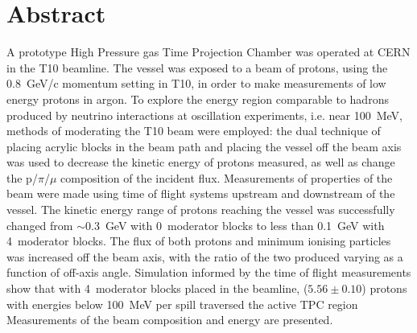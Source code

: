 \section*{Abstract}

A prototype High Pressure gas Time Projection Chamber was operated at CERN in the T10 beamline. The vessel was exposed to a beam of protons, using the 0.8~GeV/c momentum setting in T10, in order to make measurements of low energy protons in argon.
To explore the energy region comparable to hadrons produced by neutrino interactions at oscillation experiments, i.e. near 100~MeV, methods of moderating the T10 beam were employed:
the dual technique of placing acrylic blocks in the beam path and placing the vessel off the beam axis was used to decrease the kinetic energy of protons measured, as well as change the p/$\pi$/$\mu$ composition of the incident flux.
Measurements of properties of the beam were made using time of flight systems upstream and downstream of the vessel. 
The kinetic energy range of protons reaching the vessel was successfully changed from $\sim$0.3~GeV with 0~moderator blocks to less than 0.1~GeV with 4~moderator blocks.
The flux of both protons and minimum ionising particles was increased off the beam axis, with the ratio of the two produced varying as a function of off-axis angle. 
Simulation informed by the time of flight measurements show that with 4~moderator blocks placed in the beamline,  ($5.56 \pm 0.10$) protons with energies below 100~MeV per spill traversed the active TPC region
Measurements of the beam composition and energy are presented.

